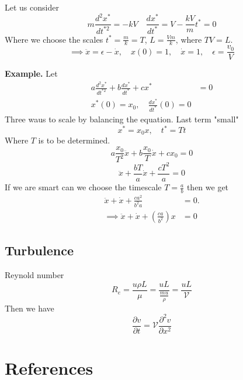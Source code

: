 \documentclass{article}
\theoremstyle{remark}
\begin{document}
Let us consider \[
  m \frac{d^2 x^{*}}{d t^{*2}}  = -kV \quad \frac{d x^{*}}{d t^{*}}  = V - \frac{kV}{m} t^{*} = 0
\] 
Where we choose the scales $t^{*} = \frac{m}{k}  = T$, $L = \frac{V m}{k} $, where  $TV = L$. \[
\implies \ddot{x} = \epsilon  - \dot{x}, \quad x\left( 0 \right) = 1, \quad \dot{x}   = 1, \quad    \epsilon  = \frac{v_{0}}{V} 
\] 
 \begin{tcolorbox}
   \textbf{Example.}  Let \[
   \begin{split}
     a \frac{d ^2 x^{*}}{d t^{*2}} + b \frac{d x^{*}}{d t^{*} }  + c x^{*} &=  0\\
     x^{*} \left( 0 \right) = x_{0} , \quad  \frac{d x^{*}}{d t^{*}} \left( 0 \right) = 0 
   \end{split} 
   \] 
   Three waus to scale by balancing the equation. Last term "small" \[
   x^{*} = x_{0} x, \quad  t^{*} = Tt 
   \] 
   Where $T$ is to be determined. \[
   a \frac{x_{0}}{T^2}  \ddot{x} + b \frac{x_{0}}{T}  \dot{x} + c x_{0}  = 0
   \] 
   \[
   \ddot{x} + \frac{bT}{a}  \dot{x} + \frac{cT^2}{a}  = 0
   \] 
   If we are smart can we choose the timescale $T = \frac{a}{b}$  then we get \[
     \begin{split}
   \ddot{x} + \dot{x} + \frac{c a^2}{b^2 a}  &=   0.  \\
   \implies  \ddot{x} + \dot{x} + \left( \frac{ca}{b^2}  \right)x &=   0
     \end{split} 
   \] 
 \end{tcolorbox}

\subsection{Turbulence}%
\label{sub:turbulence}

Reynold number \[
  R_{e} = \frac{u \rho L}{\mu }  = \frac{uL}{\frac{mu}{\rho } }  =  \frac{uL}{\mathcal{V}   }  
\] 
Then we have \[
\frac{\partial v}{\partial t}  = \mathcal{V}  \frac{\partial ^2 v}{\partial x^2} 
\] 


   
   
   

\newpage

\section{References}%
\label{sec:references}


  


\end{document}
